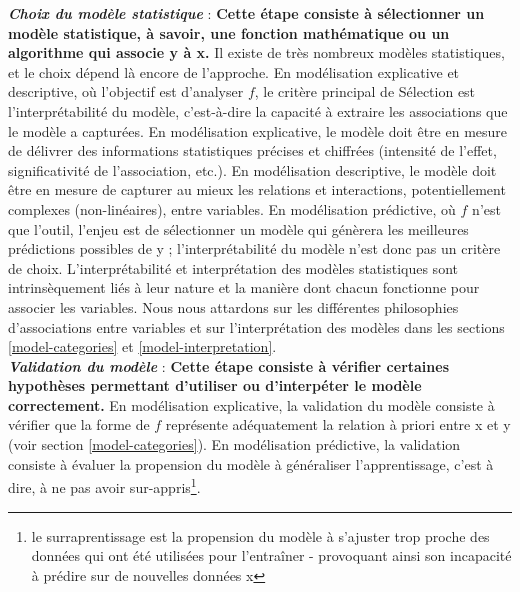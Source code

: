 \documentclass[12pt,twoside]{reedthesis}
\begin{document}
\textbf{\emph{Choix du modèle statistique}} : \textbf{Cette étape consiste à sélectionner un modèle statistique, à savoir, une fonction mathématique ou un algorithme qui associe y à x.} Il existe de très nombreux modèles statistiques, et le choix dépend là encore de l'approche. En modélisation explicative et descriptive, où l'objectif est d'analyser \(f\), le critère principal de Sélection est l'interprétabilité du modèle, c'est-à-dire la capacité à extraire les associations que le modèle a capturées. En modélisation explicative, le modèle doit être en mesure de délivrer des informations statistiques précises et chiffrées (intensité de l'effet, significativité de l'association, etc.). En modélisation descriptive, le modèle doit être en mesure de capturer au mieux les relations et interactions, potentiellement complexes (non-linéaires), entre variables. En modélisation prédictive, où \(f\) n'est que l'outil, l'enjeu est de sélectionner un modèle qui génèrera les meilleures prédictions possibles de y ; l'interprétabilité du modèle n'est donc pas un critère de choix. L'interprétabilité et interprétation des modèles statistiques sont intrinsèquement liés à leur nature et la manière dont chacun fonctionne pour associer les variables. Nous nous attardons sur les différentes philosophies d'associations entre variables et sur l'interprétation des modèles dans les sections \ref{model-categories} et \ref{model-interpretation}.\\

\textbf{\emph{Validation du modèle}} : \textbf{Cette étape consiste à vérifier certaines hypothèses permettant d'utiliser ou d'interpéter le modèle correctement.} En modélisation explicative, la validation du modèle consiste à vérifier que la forme de \(f\) représente adéquatement la relation à priori entre x et y (voir section \ref{model-categories}). En modélisation prédictive, la validation consiste à évaluer la propension du modèle à généraliser l'apprentissage, c'est à dire, à ne pas avoir sur-appris\footnote{le surraprentissage est la propension du modèle à s'ajuster trop proche des données qui ont été utilisées pour l'entraîner - provoquant ainsi son incapacité à prédire sur de nouvelles données x}.\\
\end{document}
